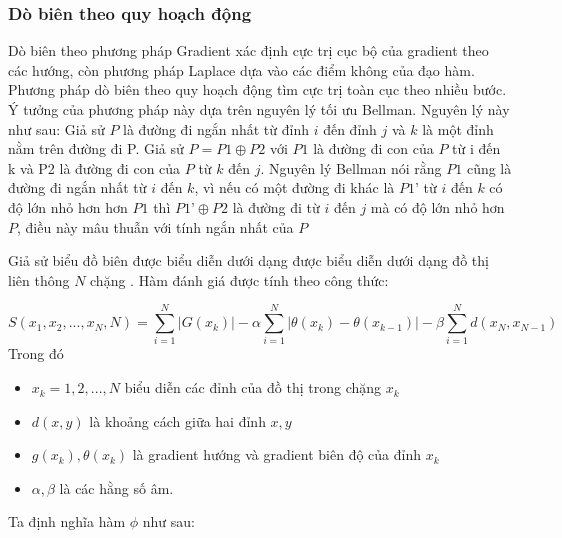 \documentclass[14pt,oneside,a4paper]{extreport}
\begin{document}
\subsubsection{Dò biên theo quy hoạch động}
Dò biên theo phương pháp Gradient xác định cực trị cục bộ của gradient theo các hướng, còn phương pháp Laplace dựa vào các điểm không của đạo hàm. Phương pháp dò biên theo quy hoạch động tìm cực trị toàn cục theo nhiều bước. Ý tưởng của phương pháp này dựa trên nguyên lý tối ưu Bellman. Nguyên lý này như sau:
Giả sử $P$ là đường đi ngắn nhất từ đỉnh $i$ đến đỉnh $j$ và $k$ là một đỉnh nằm trên đường đi P. Giả sử $P=P1\oplus P2$ với $P1$ là đường đi con của $P$ từ i đến k và P2 là đường đi con của $P$ từ $k$ đến $j$. Nguyên lý Bellman nói rằng $P1$ cũng là đường đi ngắn nhất từ $i$ đến $k$, vì nếu có một đường đi khác là $P1’$ từ $i$ đến $k$ có độ lớn nhỏ hơn hơn $P1$ thì $P1’\oplus P2$ là đường đi từ $i$ đến $j$ mà có độ lớn nhỏ hơn $P$, điều này mâu thuẫn với tính ngắn nhất của $P$

Giả sử biểu đồ biên được biểu diễn dưới dạng được biểu diễn dưới dạng đồ thị liên thông $N$ chặng . Hàm đánh giá được tính theo công thức:

\begin{equation*}
S(x_1,x_2,...,x_N,N)=\sum_{i=1}^{N}|G(x_k)|-\alpha \sum_{i=1}^{N}|\theta(x_k)-\theta(x_{k-1})|-\beta \sum_{i=1}^{N}d(x_N,x_{N-1})
\end{equation*}
Trong đó 
\begin{itemize}
\item $x_k=1,2,..., N$ biểu diễn các đỉnh của đồ thị trong chặng $x_k$
\item $d(x,y)$ là khoảng cách giữa hai đỉnh $x, y$ 
\item $g(x_k), \theta(x_k)$ là gradient hướng và gradient biên độ của đỉnh $x_k$
\item $\alpha ,\beta$ là các hằng số âm. 
\end{itemize}
Ta định nghĩa hàm $\phi$ như sau:
\end{document}
